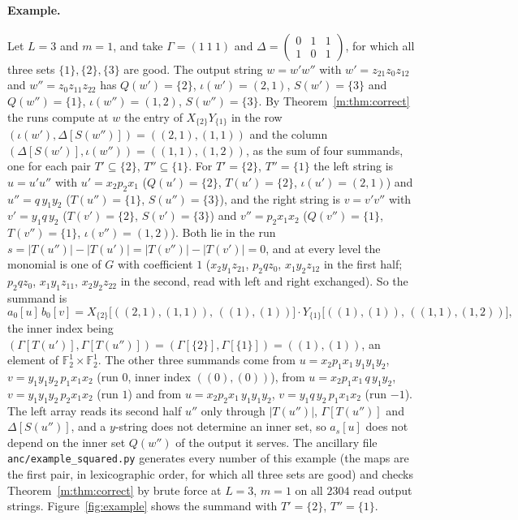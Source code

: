 \documentclass[11pt]{article}
\theoremstyle{definition}
\theoremstyle{remark}
\newcommand{\F}{\mathbb{F}_2}
\begin{document}
\paragraph{Example.} Let $L=3$ and $m=1$, and take $\Gamma=(1\ 1\ 1)$ and $\Delta=\begin{pmatrix}0&1&1\\1&0&1\end{pmatrix}$, for which all three sets $\{1\},\{2\},\{3\}$ are good. The output string $w=w'w''$ with $w'=z_{21}z_0z_{12}$ and $w''=z_0z_{11}z_{22}$ has $Q(w')=\{2\}$, $\iota(w')=(2,1)$, $S(w')=\{3\}$ and $Q(w'')=\{1\}$, $\iota(w'')=(1,2)$, $S(w'')=\{3\}$. By Theorem~\ref{m:thm:correct} the runs compute at $w$ the entry of $X_{\{2\}}Y_{\{1\}}$ in the row $(\iota(w'),\Delta[S(w'')])=((2,1),(1,1))$ and the column $(\Delta[S(w')],\iota(w''))=((1,1),(1,2))$, as the sum of four summands, one for each pair $T'\subseteq\{2\}$, $T''\subseteq\{1\}$. For $T'=\{2\}$, $T''=\{1\}$ the left string is $u=u'u''$ with $u'=x_2p_2x_1$ ($Q(u')=\{2\}$, $T(u')=\{2\}$, $\iota(u')=(2,1)$) and $u''=q\,y_1y_2$ ($T(u'')=\{1\}$, $S(u'')=\{3\}$), and the right string is $v=v'v''$ with $v'=y_1q\,y_2$ ($T(v')=\{2\}$, $S(v')=\{3\}$) and $v''=p_2x_1x_2$ ($Q(v'')=\{1\}$, $T(v'')=\{1\}$, $\iota(v'')=(1,2)$). Both lie in the run $s=|T(u'')|-|T(u')|=|T(v'')|-|T(v')|=0$, and at every level the monomial is one of $G$ with coefficient $1$ ($x_2y_1z_{21}$, $p_2qz_0$, $x_1y_2z_{12}$ in the first half; $p_2qz_0$, $x_1y_1z_{11}$, $x_2y_2z_{22}$ in the second, read with left and right exchanged). So the summand is
\[
a_0[u]\,b_0[v]=X_{\{2\}}\big[((2,1),(1,1)),\,((1),(1))\big]\cdot Y_{\{1\}}\big[((1),(1)),\,((1,1),(1,2))\big],
\]
the inner index being $(\Gamma[T(u')],\Gamma[T(u'')])=(\Gamma[\{2\}],\Gamma[\{1\}])=((1),(1))$, an element of $\F^1\times\F^1$. The other three summands come from $u=x_2p_1x_1\,y_1y_1y_2$, $v=y_1y_1y_2\,p_1x_1x_2$ (run $0$, inner index $((0),(0))$), from $u=x_2p_1x_1\,q\,y_1y_2$, $v=y_1y_1y_2\,p_2x_1x_2$ (run $1$) and from $u=x_2p_2x_1\,y_1y_1y_2$, $v=y_1q\,y_2\,p_1x_1x_2$ (run $-1$). The left array reads its second half $u''$ only through $|T(u'')|$, $\Gamma[T(u'')]$ and $\Delta[S(u'')]$, and a $y$-string does not determine an inner set, so $a_s[u]$ does not depend on the inner set $Q(w'')$ of the output it serves. The ancillary file \texttt{anc/example\_squared.py} generates every number of this example (the maps are the first pair, in lexicographic order, for which all three sets are good) and checks Theorem~\ref{m:thm:correct} by brute force at $L=3$, $m=1$ on all $2304$ read output strings. Figure~\ref{fig:example} shows the summand with $T'=\{2\}$, $T''=\{1\}$.
\end{document}
